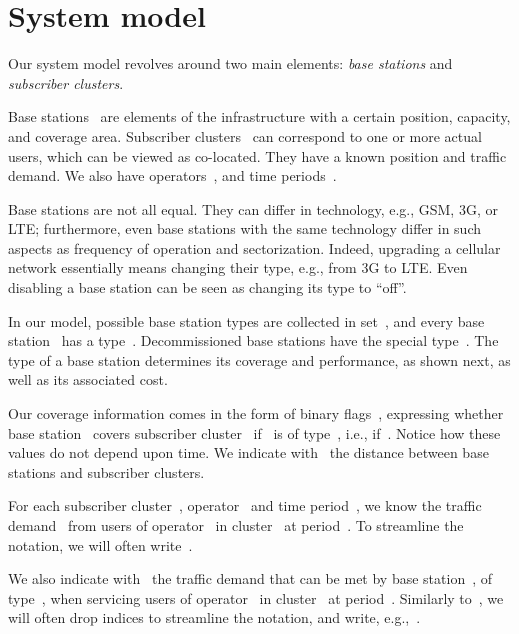 \documentclass[10pt,journal,cspaper,compsoc]{IEEEtran}
\begin{document}
\section{System model}
\label{sec:sysmodel}

Our system model revolves around two main elements: {\em base stations} and {\em subscriber clusters}.

Base stations~ are elements of the infrastructure with
a certain position, capacity, and coverage area.
Subscriber clusters~ can correspond to one or more actual users, which can be viewed as co-located. They have a
known position and traffic demand.
We also have operators~, and time periods~.

Base stations are not all equal. They can differ in technology, e.g., GSM, 3G, or LTE; furthermore,
even base stations with the same technology differ in such aspects as frequency of operation and sectorization.
Indeed, upgrading a cellular network essentially means changing their type, e.g., from 3G to LTE.
Even disabling a base station can be seen as changing its type to ``off''.

In our model, possible base station types are collected in set~, and every base station~
has a type~. Decommissioned base stations have the special type~. The type of a base
station determines its coverage and performance, as shown next, as well as its associated cost.

Our coverage information comes in the form of binary flags~, expressing whether
base station~ covers subscriber cluster~
if~ is of type~, i.e., if~.
Notice how these values do not depend upon time. We indicate
with~ the distance between base stations and subscriber clusters.

For each subscriber cluster~, operator~ and time period~,
we know the traffic demand~ from users of operator~ in cluster~ at period~.
To streamline the notation, we will often write~.

We also indicate with~
the traffic demand that can be met by base station~, of type~,
when servicing users of operator~ in cluster~ at period~.
Similarly to~, we will often drop indices to streamline the notation, and write, e.g.,~.
\end{document}
